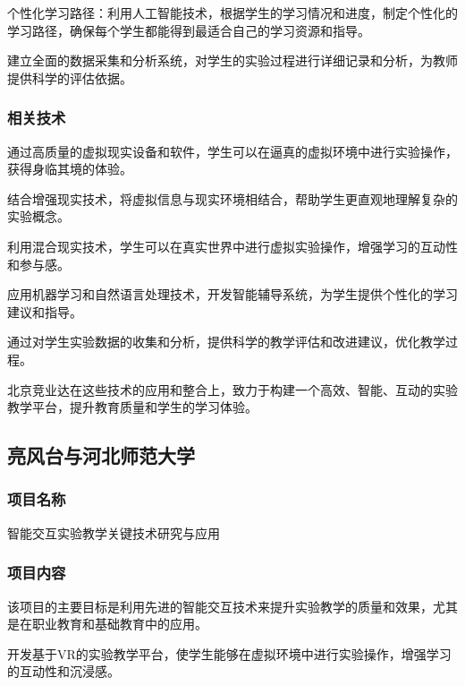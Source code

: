 个性化学习路径：利用人工智能技术，根据学生的学习情况和进度，制定个性化的学习路径，确保每个学生都能得到最适合自己的学习资源和指导。

建立全面的数据采集和分析系统，对学生的实验过程进行详细记录和分析，为教师提供科学的评估依据。

\subsubsection{相关技术}


通过高质量的虚拟现实设备和软件，学生可以在逼真的虚拟环境中进行实验操作，获得身临其境的体验。

结合增强现实技术，将虚拟信息与现实环境相结合，帮助学生更直观地理解复杂的实验概念。

利用混合现实技术，学生可以在真实世界中进行虚拟实验操作，增强学习的互动性和参与感。

应用机器学习和自然语言处理技术，开发智能辅导系统，为学生提供个性化的学习建议和指导。

通过对学生实验数据的收集和分析，提供科学的教学评估和改进建议，优化教学过程。

北京竞业达在这些技术的应用和整合上，致力于构建一个高效、智能、互动的实验教学平台，提升教育质量和学生的学习体验。

\subsection{亮风台与河北师范大学}

\subsubsection{项目名称}

智能交互实验教学关键技术研究与应用

\subsubsection{项目内容}

该项目的主要目标是利用先进的智能交互技术来提升实验教学的质量和效果，尤其是在职业教育和基础教育中的应用。

开发基于VR的实验教学平台，使学生能够在虚拟环境中进行实验操作，增强学习的互动性和沉浸感。

